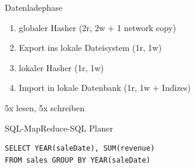 \documentclass{beamer}
\begin{document}
\begin{frame}{Datenladephase}
  \begin{enumerate}
    \item globaler Hasher (2r, 2w + 1 network copy)
    \item Export ins lokale Dateisystem (1r, 1w)
    \item lokaler Hasher (1r, 1w)
    \item Import in lokale Datenbank (1r, 1w + Indizes)
  \end{enumerate}
  \pause
  5x lesen, 5x schreiben
\end{frame}

\begin{frame}[fragile]{SQL-MapReduce-SQL Planer}
\begin{verbatim}
SELECT YEAR(saleDate), SUM(revenue)
FROM sales GROUP BY YEAR(saleDate)
\end{verbatim}
\end{frame}
\end{document}
